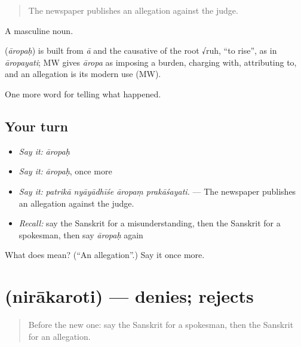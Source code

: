 \begin{quote}
The newspaper publishes an allegation against the judge.
\end{quote}

A masculine noun.

\begin{cousinweb}
\textbf{} (\emph{āropaḥ}) is built from \emph{ā} and the causative of the root √ruh, \textquotedblleft{}to rise\textquotedblright{}, as in \emph{āropayati}; MW gives \emph{āropa} as imposing a burden, charging with, attributing to, and an allegation is its modern use (MW).
\end{cousinweb}

\begin{grammarlens}[title={What you've built}]
One more word for telling what happened.
\end{grammarlens}

\subsection*{Your turn}
\begin{itemize}
\raggedright
  \item \emph{Say it:} \emph{āropaḥ}
  \item \emph{Say it:} \emph{āropaḥ}, once more
  \item \emph{Say it:} \emph{patrikā nyāyādhīśe āropaṃ prakāśayati.} — The newspaper publishes an allegation against the judge.
  \item \emph{Recall:} say the Sanskrit for a misunderstanding, then the Sanskrit for a spokesman, then say \emph{āropaḥ} again
\end{itemize}

\begin{tcolorbox}[breakable,colback=teal!4,colframe=teal!35!black,title={Before you move on}]
What does  mean? (\textquotedblleft{}An allegation\textquotedblright{}.) Say it once more.
\end{tcolorbox}
\section[\texorpdfstring{\sk{निराकरोति} (nirākaroti)}{निराकरोति (nirākaroti)}]{ (nirākaroti) — denies; rejects}

\label{lesson:SA-C312-nirakaroti}



\begin{quote}
Before the new one: say the Sanskrit for a spokesman, then the Sanskrit for an allegation.
\end{quote}

